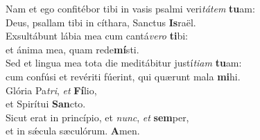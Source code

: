 \evenverse Nam et ego confitébor tibi in vasis psalmi veri\textit{tá}\textit{tem} \textbf{tu}am:~\*\\
\evenverse Deus, psallam tibi in cíthara, Sanctus \textbf{Is}raël.\\
\oddverse Exsultábunt lábia mea cum cantá\textit{ve}\textit{ro} \textbf{ti}bi:~\*\\
\oddverse et ánima mea, quam rede\textbf{mí}sti.\\
\evenverse Sed et lingua mea tota die meditábitur justí\textit{ti}\textit{am} \textbf{tu}am:~\*\\
\evenverse cum confúsi et revériti fúerint, qui quærunt mala \textbf{mi}hi.\\
\oddverse Glória Pa\textit{tri}, \textit{et} \textbf{Fí}lio,~\*\\
\oddverse et Spirítui \textbf{San}cto.\\
\evenverse Sicut erat in princípio, et \textit{nunc}, \textit{et} \textbf{sem}per,~\*\\
\evenverse et in sǽcula sæculórum. \textbf{A}men.\\

